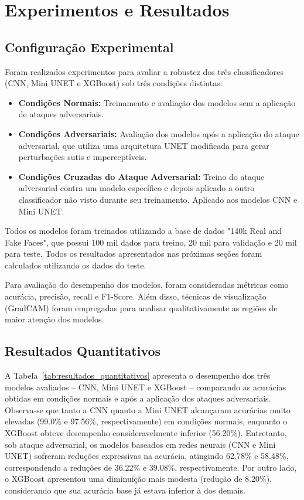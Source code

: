 \documentclass[12pt]{article}
\begin{document}
\section{Experimentos e Resultados}

\subsection{Configuração Experimental}
Foram realizados experimentos para avaliar a robustez dos três classificadores
(CNN, Mini UNET e XGBoost) sob três condições distintas:

\begin{itemize} \item \textbf{Condições Normais:} Treinamento e avaliação dos modelos sem a aplicação de ataques adversariais.
    \item \textbf{Condições Adversariais:} Avaliação dos modelos após a aplicação do ataque adversarial, que utiliza uma arquitetura UNET modificada para gerar perturbações sutis e imperceptíveis.
    \item \textbf{Condições Cruzadas do Ataque Adversarial:} Treino do ataque adversarial contra um modelo específico e depois aplicado a outro classificador não visto durante seu treinamento. Aplicado aos modelos CNN e Mini UNET.
\end{itemize}

Todos os modelos foram treinados utilizando a base de dados "140k Real and Fake
Faces", que possui 100 mil dados para treino, 20 mil para validação e 20 mil
para teste. Todos os resultados apresentados nas próximas seções foram
calculados utilizando os dados do teste.

Para avaliação do desempenho dos modelos, foram consideradas métricas como
acurácia, precisão, recall e F1-Score. Além disso, técnicas de visualização
(GradCAM) foram empregadas para analisar qualitativamente as regiões de maior
atenção dos modelos.

\subsection{Resultados Quantitativos}
A Tabela~\ref{tab:resultados_quantitativos} apresenta o desempenho dos três
modelos avaliados – CNN, Mini UNET e XGBoost – comparando as acurácias obtidas
em condições normais e após a aplicação dos ataques adversariais. Observa-se
que tanto a CNN quanto a Mini UNET alcançaram acurácias muito elevadas (99.0\%
e 97.56\%, respectivamente) em condições normais, enquanto o XGBoost obteve
desempenho consideravelmente inferior (56.20\%). Entretanto, sob ataque
adversarial, os modelos baseados em redes neurais (CNN e Mini UNET) sofreram
reduções expressivas na acurácia, atingindo 62.78\% e 58.48\%, correspondendo a
reduções de 36.22\% e 39.08\%, respectivamente. Por outro lado, o XGBoost
apresentou uma diminuição mais modesta (redução de 8.20\%), considerando que
sua acurácia base já estava inferior à dos demais.
\end{document}
